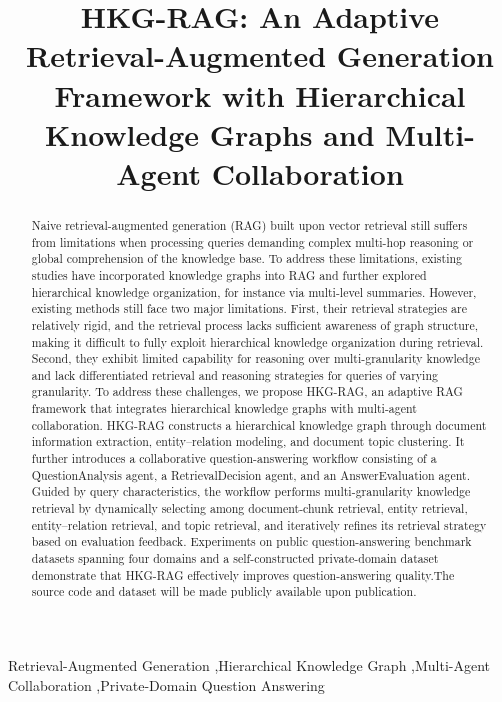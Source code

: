 \documentclass[preprint,12pt,authoryear]{elsarticle}
\begin{document}
\begin{frontmatter}

\title{HKG-RAG: An Adaptive Retrieval-Augmented Generation Framework with Hierarchical Knowledge Graphs and Multi-Agent Collaboration}


\begin{abstract}
Naive retrieval-augmented generation (RAG) built upon vector retrieval still suffers from limitations when processing queries demanding complex multi-hop reasoning or global comprehension of the knowledge base. To address these limitations, existing studies have incorporated knowledge graphs into RAG and further explored hierarchical knowledge organization, for instance via multi-level summaries. However, existing methods still face two major limitations. First, their retrieval strategies are relatively rigid, and the retrieval process lacks sufficient awareness of graph structure, making it difficult to fully exploit hierarchical knowledge organization during retrieval. Second, they exhibit limited capability for reasoning over multi-granularity knowledge and lack differentiated retrieval and reasoning strategies for queries of varying granularity. To address these challenges, we propose HKG-RAG, an adaptive RAG framework that integrates hierarchical knowledge graphs with multi-agent collaboration. HKG-RAG constructs a hierarchical knowledge graph through document information extraction, entity--relation modeling, and document topic clustering. It further introduces a collaborative question-answering workflow consisting of a QuestionAnalysis agent, a RetrievalDecision agent, and an AnswerEvaluation agent. Guided by query characteristics, the workflow performs multi-granularity knowledge retrieval by dynamically selecting among document-chunk retrieval, entity retrieval, entity--relation retrieval, and topic retrieval, and iteratively refines its retrieval strategy based on evaluation feedback. Experiments on public question-answering benchmark datasets spanning four domains and a self-constructed private-domain dataset demonstrate that HKG-RAG effectively improves question-answering quality.The source code and dataset will be made publicly available upon publication.
\end{abstract}


\begin{keyword}
Retrieval-Augmented Generation
\sep Hierarchical Knowledge Graph
\sep Multi-Agent Collaboration
\sep Private-Domain Question Answering
\end{keyword}

\end{frontmatter}
\end{document}
